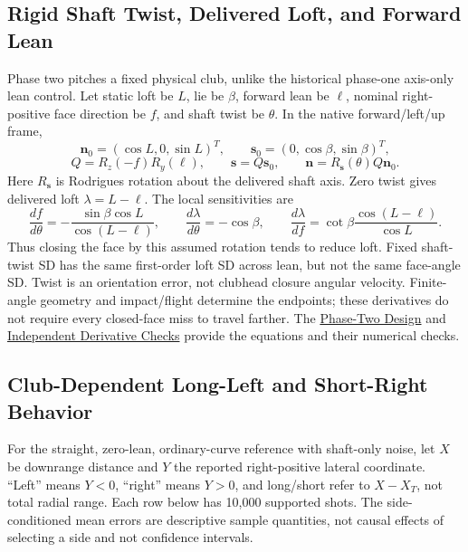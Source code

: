 \documentclass[11pt,letterpaper]{article}
\begin{document}
\subsection{Rigid Shaft Twist, Delivered Loft, and Forward Lean}
Phase two pitches a fixed physical club, unlike the historical phase-one
axis-only lean control. Let static loft be $L$, lie be $\beta$, forward lean
be $\ell$, nominal right-positive face direction be $f$, and shaft twist be
$\theta$. In the native forward/left/up frame,
\[
 \mathbf n_0=(\cos L,0,\sin L)^T,\qquad
 \mathbf s_0=(0,\cos\beta,\sin\beta)^T,
\]
\[
 Q=R_z(-f)R_y(\ell),\qquad \mathbf s=Q\mathbf s_0,\qquad
 \mathbf n=R_{\mathbf s}(\theta)Q\mathbf n_0.
\]
Here $R_{\mathbf s}$ is Rodrigues rotation about the delivered shaft axis.
Zero twist gives delivered loft $\lambda=L-\ell$. The local sensitivities are
\[
 \frac{df}{d\theta}=-\frac{\sin\beta\cos L}{\cos(L-\ell)},\qquad
 \frac{d\lambda}{d\theta}=-\cos\beta,\qquad
 \frac{d\lambda}{df}=\cot\beta\frac{\cos(L-\ell)}{\cos L}.
\]
Thus closing the face by this assumed rotation tends to reduce loft. Fixed
shaft-twist SD has the same first-order loft SD across lean, but not the same
face-angle SD. Twist is an orientation error, not clubhead closure angular
velocity. Finite-angle geometry and impact/flight determine the endpoints;
these derivatives do not require every closed-face miss to travel farther.
The \href{phase2/DESIGN.md}{Phase-Two Design} and
\href{phase2/validation/GEOMETRY_DERIVATIVES.md}{Independent Derivative Checks}
provide the equations and their numerical checks.

\subsection{Club-Dependent Long-Left and Short-Right Behavior}
For the straight, zero-lean, ordinary-curve reference with shaft-only noise,
let $X$ be downrange distance and $Y$ the reported right-positive lateral
coordinate. ``Left'' means $Y<0$, ``right'' means $Y>0$, and long/short refer
to $X-X_T$, not total radial range. Each row below has 10,000 supported shots.
The side-conditioned mean errors are descriptive sample quantities, not
causal effects of selecting a side and not confidence intervals.
\end{document}
